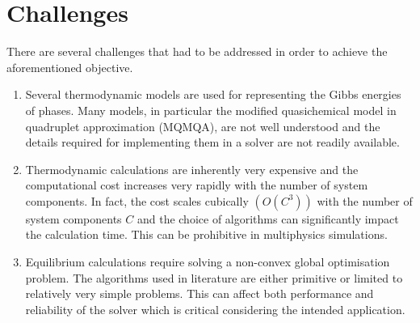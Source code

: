 \section{Challenges}
    There are several challenges that had to be addressed in order to achieve the aforementioned objective.
    \begin{enumerate}
        \item Several thermodynamic models are used for representing the Gibbs energies of phases. Many models, in particular the modified quasichemical model in quadruplet approximation (MQMQA), are not well understood and the details required for implementing them in a solver are not readily available.
        \item Thermodynamic calculations are inherently very expensive and the computational cost increases very rapidly with the number of system components. In fact, the cost  scales cubically $\left(\mathit{O}(C^3)\right)$ with the number of system components $C$ and the choice of algorithms can significantly impact the calculation time. This can be prohibitive in multiphysics simulations.
        \item Equilibrium calculations require solving a non-convex global optimisation problem. The algorithms used in literature are either primitive or limited to relatively very simple problems. This can affect both performance and reliability of the solver which is critical considering the intended application.
        \end{enumerate}

